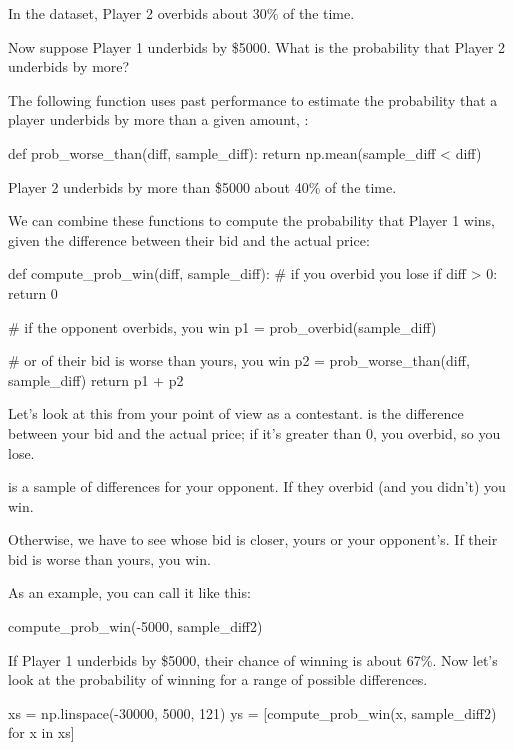 \documentclass[12pt]{book}
\theoremstyle{exercise}
\begin{document}
In the dataset, Player 2 overbids about 30\% of the time.

Now suppose Player 1 underbids by \$5000.
What is the probability that Player 2 underbids by more?

The following function uses past performance to estimate the probability that a player underbids by more than a given amount, :

\begin{code}
def prob_worse_than(diff, sample_diff):
    return np.mean(sample_diff < diff)
\end{code}

Player 2 underbids by more than \$5000 about 40\% of the time.

We can combine these functions to compute the probability that Player 1 wins, given the difference between their bid and the actual price:

\begin{code}
def compute_prob_win(diff, sample_diff):
    # if you overbid you lose
    if diff > 0:
        return 0
    
    # if the opponent overbids, you win
    p1 = prob_overbid(sample_diff)
    
    # or of their bid is worse than yours, you win
    p2 = prob_worse_than(diff, sample_diff)
    return p1 + p2
\end{code}

Let's look at this from your point of view as a contestant.
 is the difference between your bid and the actual price; if it's greater than 0, you overbid, so you lose.

 is a sample of differences for your opponent.
If they overbid (and you didn't) you win.

Otherwise, we have to see whose bid is closer, yours or your opponent's.  If their bid is worse than yours, you win.

As an example, you can call it like this:

\begin{code}
compute_prob_win(-5000, sample_diff2)
\end{code}

If Player 1 underbids by \$5000, their chance of winning is about 67\%.
Now let's look at the probability of winning for a range of possible differences.

\begin{code}
xs = np.linspace(-30000, 5000, 121)
ys = [compute_prob_win(x, sample_diff2) for x in xs]
\end{code}
\end{document}
